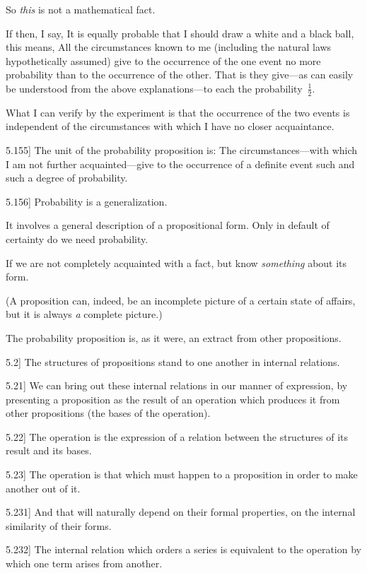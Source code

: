 \documentclass[12pt,oneside]{book}[2007/10/19]
\newcommand{\PropositionE}[2]{%
  \item[\phantomsection\label{PropE:#1}\PropGRef{#1}] #2%
}
\newcommand{\PropGRef}[1]{\hyperref[PropG:#1]{#1}}
\begin{document}
\begin{propositions}
{So \emph{this} is not a mathematical fact.

If then, I say, It is equally probable that
I should draw a white and a black ball, this
means, All the circumstances known to me (including
the natural laws hypothetically assumed)
give to the occurrence of the one event no more
probability than to the occurrence of the other.
That is they give---as can easily be understood
from the above explanations---to each the
probability~$\frac{1}{2}$.

What I can verify by the experiment is that
the occurrence of the two events is independent
of the circumstances with which I have no closer
acquaintance.}


\PropositionE{5.155}
{The unit of the probability proposition is: The
circumstances---with which I am not further acquainted---give
to the occurrence of a definite event
such and such a degree of probability.}


\PropositionE{5.156}
{Probability is a generalization.

It involves a general description of a propositional
form. Only in default of certainty do we
need probability.

If we are not completely acquainted with a fact,
but know \emph{something} about its form.

(A proposition can, indeed, be an incomplete
picture of a certain state of affairs, but it is always
\emph{a} complete picture.)

The probability proposition is, as it were, an
extract from other propositions.}


\PropositionE{5.2}
{The structures of propositions stand to one
another in internal relations.}


\PropositionE{5.21}
{We can bring out these internal relations in
our manner of expression, by presenting a proposition
as the result of an operation which produces
it from other propositions (the bases of the
operation).}


\PropositionE{5.22}
{The operation is the expression of a relation
between the structures of its result and its
bases.}


\PropositionE{5.23}
{The operation is that which must happen to a
proposition in order to make another out of it.}


\PropositionE{5.231}
{And that will naturally depend on their formal
properties, on the internal similarity of their
forms.}


\PropositionE{5.232}
{The internal relation which orders a series is
equivalent to the operation by which one term
arises from another.}



\end{propositions}
\end{document}
